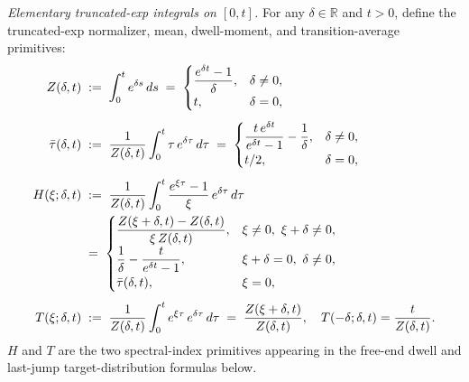 \emph{Elementary truncated-exp integrals on $[0, t]$.}
For any $\delta \in \mathbb{R}$ and $t > 0$, define the truncated-exp
normalizer, mean, dwell-moment, and transition-average primitives:
\begin{align}
  Z(\delta, t)
  &\;:=\; \int_0^t e^{\delta s}\, ds
  \;=\;
    \begin{cases}
      \dfrac{e^{\delta t} - 1}{\delta}, & \delta \ne 0,\\
      t, & \delta = 0,
    \end{cases}
  \label{eq:arch-Z} \\[4pt]
  \bar\tau(\delta, t)
  &\;:=\; \frac{1}{Z(\delta, t)} \int_0^t \tau\, e^{\delta \tau}\, d\tau
  \;=\;
    \begin{cases}
      \dfrac{t\, e^{\delta t}}{e^{\delta t} - 1} - \dfrac{1}{\delta}, & \delta \ne 0, \\[4pt]
      t/2, & \delta = 0,
    \end{cases}
  \label{eq:arch-Etau} \\[4pt]
  H(\xi; \delta, t)
  &\;:=\; \frac{1}{Z(\delta, t)} \int_0^t \frac{e^{\xi \tau} - 1}{\xi}\,
                                             e^{\delta \tau}\, d\tau \notag \\
  &\;=\;
    \begin{cases}
      \dfrac{Z(\xi + \delta, t) - Z(\delta, t)}{\xi\, Z(\delta, t)},
        & \xi \ne 0,\ \xi + \delta \ne 0, \\[6pt]
      \dfrac{1}{\delta} - \dfrac{t}{e^{\delta t} - 1},
        & \xi + \delta = 0,\ \delta \ne 0, \\[4pt]
      \bar\tau(\delta, t),
        & \xi = 0,
    \end{cases}
  \label{eq:arch-H} \\[4pt]
  T(\xi; \delta, t)
  &\;:=\; \frac{1}{Z(\delta, t)} \int_0^t e^{\xi \tau}\, e^{\delta \tau}\, d\tau
  \;=\; \frac{Z(\xi + \delta, t)}{Z(\delta, t)}, \quad
  T(-\delta; \delta, t) = \frac{t}{Z(\delta, t)}.
  \label{eq:arch-T}
\end{align}
$H$ and $T$ are the two spectral-index primitives appearing in the
free-end dwell and last-jump target-distribution formulas below.

